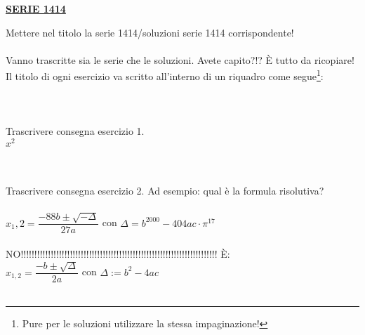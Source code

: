 \documentclass[a4paper,10pt]{article}
\begin{document}
\pagestyle{empty}

\begin{center}
\LARGE{\bf \underline{SERIE 1414}}\\[1mm]
\end{center}
Mettere nel titolo la serie 1414/soluzioni serie 1414 corrispondente!\\\\

Vanno trascritte sia le serie che le soluzioni. Avete capito?!? 
\`E tutto da ricopiare!\\
Il titolo di ogni esercizio va scritto all'interno di un riquadro come segue\footnote{Pure per le soluzioni utilizzare la stessa impaginazione!}:\\\\

\\\\
Trascrivere consegna esercizio 1.\\
$x^2$

\vspace*{1cm}
\\\\
Trascrivere consegna esercizio 2. Ad esempio: qual \`e la formula risolutiva?\\\\
$x_1,2=\dfrac{-88b\pm\sqrt{-\Delta}}{27a}$ con $\Delta=b^{2000}-404ac\cdot\pi^{17}$\\\\
NO!!!!!!!!!!!!!!!!!!!!!!!!!!!!!!!!!!!!!!!!!!!!!!!!!!!!!!!!!!!!!!!!!!!!!!!! \`E:\\

$x_{1,2}=\dfrac{-b\pm\sqrt{\Delta}}{2a}$ con $\Delta:=b^2-4ac$\\\\
\end{document}
